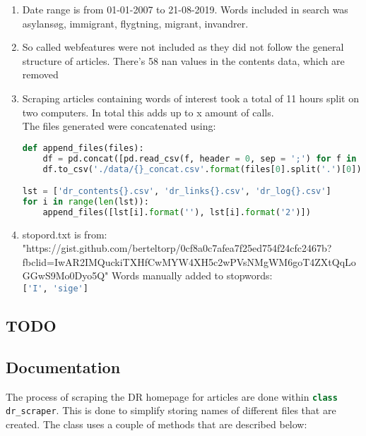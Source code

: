 \documentclass[10pt,a4paper]{article}
\author{Sebastian Baltser}
\newcommand{\python}{\lstinline[language=Python]}
\begin{document}
	\begin{enumerate}
		\item Date range is from 01-01-2007 to 21-08-2019. Words included in search was asylansøg, immigrant, flygtning, migrant, invandrer.
		\item So called webfeatures were not included as they did not follow the general structure of articles. There's 58 nan values in the contents data, which are removed
		\item Scraping articles containing words of interest took a total of 11 hours split on two computers. In total this adds up to x amount of calls.\\
		The files generated were concatenated using:
		
\begin{lstlisting}[language=Python]
def append_files(files):
	df = pd.concat([pd.read_csv(f, header = 0, sep = ';') for f in files], axis = 0)
	df.to_csv('./data/{}_concat.csv'.format(files[0].split('.')[0]), index = False) #Save to csv named as the first file with 'concat' appended

lst = ['dr_contents{}.csv', 'dr_links{}.csv', 'dr_log{}.csv']
for i in range(len(lst)):
	append_files([lst[i].format(''), lst[i].format('2')])
\end{lstlisting}
	\item stopord.txt is from:\\ "https://gist.github.com/berteltorp/0cf8a0c7afea7f25ed754f24cfc2467b?fbclid=IwAR2IMQuckiTXHfCwMYW4XH5c2wPVsNMgWM6goT4ZXtQqLoGGwS9Mo0Dyo5Q"
	Words manually added to stopwords: \\
	\python{['I', 'sige']}
	\end{enumerate}
	\subsection{TODO}
	\begin{enumerate}
	\end{enumerate}
	\subsection{Documentation}
		The process of scraping the DR homepage for articles are done within \lstinline[language=Python]|class dr_scraper|. This is done to simplify storing names of different files that are created. The class uses a couple of methods that are described below:
\end{document}
